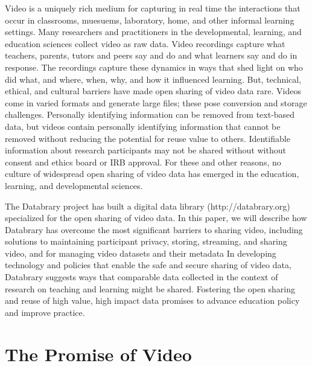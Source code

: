 \documentclass[letterpaper,man,apacite]{apa6}
\begin{document}
Video is a uniquely rich medium for capturing in real time the interactions that occur in classrooms, muesuems, laboratory, home, and other informal learning settings.
Many researchers and practitioners in the developmental, learning, and education sciences collect video as raw data.
Video recordings capture what teachers, parents, tutors and peers say and do and what learners say and do in response.
The recordings capture these dynamics in ways that shed light on who did what, and where, when, why, and how it influenced learning.
But, technical, ethical, and cultural barriers have made open sharing of video data rare.
Videos come in varied formats and generate large files; these pose conversion and storage challenges.
Personally identifying information can be removed from text-based data, but videos contain personally identifying information that cannot be removed without reducing the potential for reuse value to others. 
Identifiable information about research participants may not be shared without without consent and ethics board or IRB approval.
For these and other reasons, no culture of widespread open sharing of video data has emerged in the education, learning, and developmental sciences. 

The Databrary project has built a digital data library (http://databrary.org) specialized for the open sharing of video data.
In this paper, we will describe how Databrary has overcome the most significant barriers to sharing video, including solutions to maintaining participant privacy, storing, streaming, and sharing video, and for managing video datasets and their metadata
In developing technology and policies that enable the safe and secure sharing of video data, Databrary suggests ways that comparable data collected in the context of research on teaching and learning might be shared.
Fostering the open sharing and reuse of high value, high impact data promises to advance education policy and improve practice.

\section{The Promise of Video}
\end{document}
